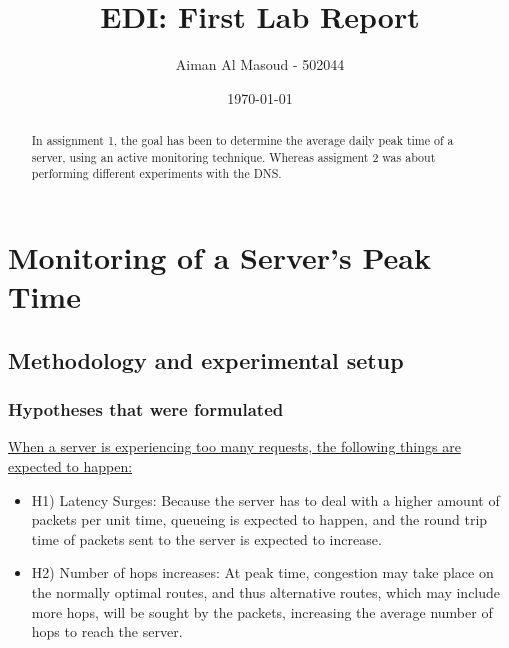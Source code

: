 \documentclass[a4paper,10pt]{article}
\begin{document}
\title{EDI: First Lab Report}
\author{Aiman Al Masoud - 502044}
\date{\today}

\maketitle

\begin{abstract}

In assignment 1, the goal has been to determine the average daily peak time of a server, using an active monitoring technique. Whereas assigment 2 was about performing different experiments with the DNS.

\end{abstract}

\clearpage

\setcounter{page}{1}

\section{Monitoring of a Server's Peak Time}


\subsection{Methodology and experimental setup}


\maketitle
\subsubsection{Hypotheses that were formulated}


\underline{When a server is experiencing too many requests, the following things are expected to happen: }


\begin{itemize}

\item \label{hyp1} H1) Latency Surges: Because the server has to deal with a higher amount of packets per unit time, queueing is expected to happen, and the round trip time of packets sent to the server is expected to increase.

\item H2) Number of hops increases: At peak time, congestion may take place on the normally optimal routes, and thus alternative routes, which may include more hops, will be sought by the packets, increasing the average number of hops to reach the server.

\end{itemize}
\end{document}

